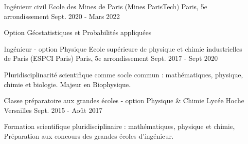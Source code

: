 

\begin{cventries}

  \cventry
    {Ingénieur civil} %
    {Ecole des Mines de Paris (Mines ParisTech)} %
    {Paris, 5e arrondissement} %
    {Sept. 2020 - Mars 2022} %
    {
        \begin{cvitems}
          \item{Option Géostatistiques et Probabilités appliquées}
        \end{cvitems}
    }
  \cventry
    {Ingénieur - option Physique} %
    {Ecole supérieure de physique et chimie industrielles de Paris (ESPCI Paris)} %
    {Paris, 5e arrondissement} %
    {Sept. 2017 - Sept 2020} %
    {
        \begin{cvitems}
          \item{Pluridisciplinarité scientifique comme socle commun : mathématiques, physique, chimie et biologie. Majeur en Biophysique.}
        \end{cvitems}
    }
  \cventry
    {Classe préparatoire aux grandes écoles - option Physique \& Chimie} %
    {Lycée Hoche} %
    {Versailles} %
    {Sept. 2015 - Août 2017}
    { \begin{cvitems}
        \item {Formation scientifique pluridisciplinaire : mathématiques, physique et chimie, Préparation aux concours des grandes écoles d'ingénieur.}
        \end{cvitems}
    }
\end{cventries}

